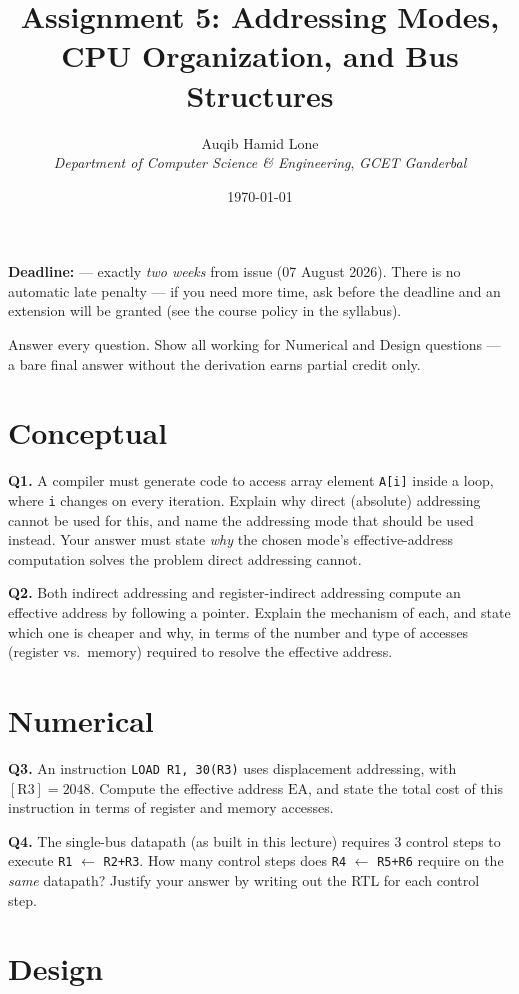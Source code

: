 \documentclass[11pt]{article}
\title{Assignment 5: Addressing Modes, CPU Organization, and Bus Structures}
\author{Auqib Hamid Lone\\[0.3em]
  \emph{Department of Computer Science \& Engineering}, \emph{GCET Ganderbal}}
\date{\today}
\begin{document}
\maketitle

\noindent\textbf{Deadline:}  --- exactly \emph{two weeks} from issue (07 August 2026). There is no automatic late penalty --- if you need more time, ask before the deadline and an extension will be granted (see the course policy in the syllabus).

\noindent Answer every question. Show all working for Numerical and Design questions --- a bare final answer without the derivation earns partial credit only.

\section{Conceptual}

\textbf{Q1.} A compiler must generate code to access array element \texttt{A[i]} inside a loop, where \texttt{i} changes on every iteration. Explain why direct (absolute) addressing cannot be used for this, and name the addressing mode that should be used instead. Your answer must state \emph{why} the chosen mode's effective-address computation solves the problem direct addressing cannot.

\textbf{Q2.} Both indirect addressing and register-indirect addressing compute an effective address by following a pointer. Explain the mechanism of each, and state which one is cheaper and why, in terms of the number and type of accesses (register vs.\ memory) required to resolve the effective address.

\section{Numerical}

\textbf{Q3.} An instruction \texttt{LOAD R1, 30(R3)} uses displacement addressing, with $[\text{R3}] = 2048$. Compute the effective address $\text{EA}$, and state the total cost of this instruction in terms of register and memory accesses.

\textbf{Q4.} The single-bus datapath (as built in this lecture) requires 3 control steps to execute \texttt{R1} $\gets$ \texttt{R2+R3}. How many control steps does \texttt{R4} $\gets$ \texttt{R5+R6} require on the \emph{same} datapath? Justify your answer by writing out the RTL for each control step.

\section{Design}
\end{document}

